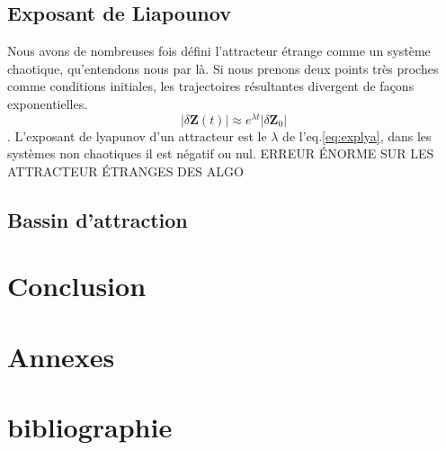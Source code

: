 \documentclass{wsdcr}
\begin{document}
\subsection{Exposant de Liapounov}
Nous avons de nombreuses fois défini l'attracteur étrange comme un système chaotique, qu'entendons nous par là. Si nous prenons deux points très proches comme conditions initiales, les trajectoires résultantes divergent de façons exponentielles.
\begin{equation}
|\delta \mathbf {Z} (t)|\approx e^{\lambda t}|\delta \mathbf {Z} _{0}|
\label{eq:explya}
\end{equation}. L'exposant de lyapunov d'un attracteur est le $\lambda$ de l'eq.\ref{eq:explya}, dans les systèmes non chaotiques il est négatif ou nul.
ERREUR ÉNORME SUR LES ATTRACTEUR ÉTRANGES DES ALGO
\subsection{Bassin d'attraction}
\section{Conclusion}

\section{Annexes}
\section{bibliographie}
\nocite{*}
\printbibliography



%
\end{document}
